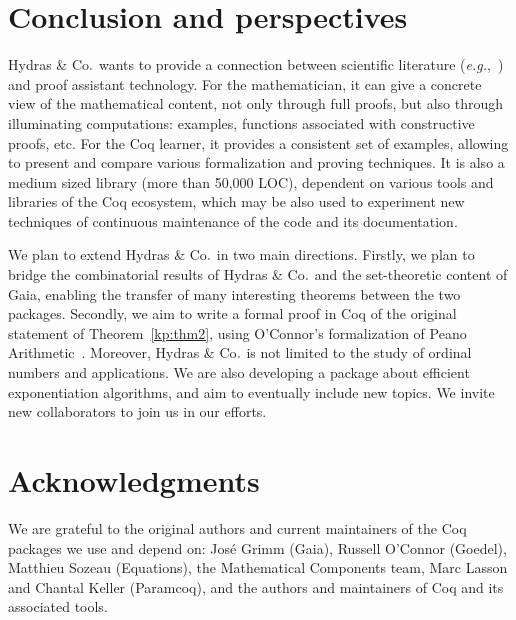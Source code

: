\documentclass{easychair}
\newcommand{\TODO}[2][]{[\textcolor{red}{TODO (#1):} \emph{#2}]}
\newcommand{\coq}{Coq\xspace}
\newcommand{\gaia}{Gaia\xspace}
\newcommand{\Hydras}{Hydras \& Co$\text.$\xspace}
\begin{document}
\section{Conclusion and perspectives}


\Hydras wants to provide a connection between scientific literature (\emph{e.g.},~\cite{KP82, KS81, schutte}) and proof assistant technology. For the mathematician, it can give a concrete view of the mathematical content, not only through full proofs, but also through illuminating computations: examples, functions associated with constructive proofs, etc. For the \coq learner, it provides a consistent set of examples,
allowing to present and compare various formalization and proving techniques. %
It is also a medium sized library (more than 50,000 LOC), dependent on various tools and libraries of the \coq ecosystem, which  may be also used to experiment new techniques of continuous maintenance of the code and its documentation.










We plan to extend \Hydras in two main directions. Firstly, we plan to bridge the combinatorial results of \Hydras and the set-theoretic content of \gaia, enabling the transfer of many interesting theorems between the two packages. Secondly, we aim to write a formal proof in \coq of the original statement of Theorem~\ref{kp:thm2}, using O'Connor's formalization of Peano Arithmetic~\cite{Goedel}.
%
Moreover, \Hydras is not limited to the study of ordinal numbers and applications.
We are also developing a package about efficient exponentiation
algorithms, and aim to eventually include new topics. We invite new collaborators to join us in our efforts.

\section*{Acknowledgments}
\label{sect:acks}
We are grateful to the original authors and current maintainers of the Coq packages we use and depend on: José Grimm (Gaia), Russell O'Connor (Goedel), Matthieu Sozeau (Equations), the Mathematical Components team, Marc Lasson and Chantal Keller (Paramcoq), and the authors and maintainers of \coq and its associated tools.


\label{sect:bib}

%
%
%


%
\end{document}
